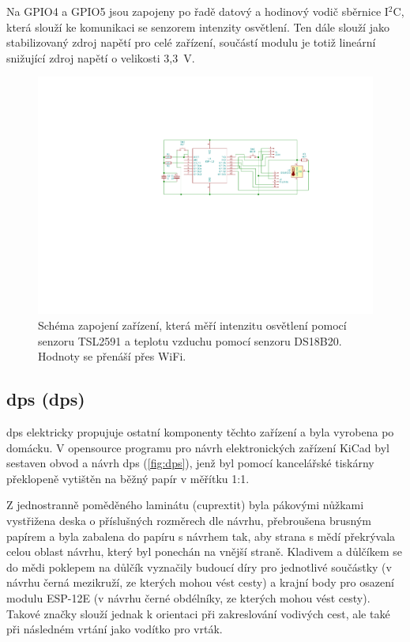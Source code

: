         Na GPIO4 a GPIO5 jsou zapojeny po řadě datový a hodinový vodič sběrnice I$^2$C, která slouží ke komunikaci se senzorem intenzity osvětlení. Ten dále slouží jako stabilizovaný zdroj napětí pro celé zařízení, součástí modulu je totiž lineární snižující zdroj napětí o velikosti 3{,}3~V.
        \begin{figure}
            \centering
            \includegraphics[draft=\draftfig,width=\textwidth,trim={10.8cm 10cm 5.5cm 5.3cm},clip]{img/hw/esp_lux_temp_sch.pdf}
            \caption[Schéma zapojení měřicích zařízení]{Schéma zapojení zařízení, která měří intenzitu osvětlení pomocí senzoru TSL2591 a teplotu vzduchu pomocí senzoru DS18B20. Hodnoty se přenáší přes WiFi.}
            \label{fig:schema}
        \end{figure}
    \subsection{\Acrlong{dps} (\acrshort{dps})}
        \acrshort{dps} elektricky propujuje ostatní komponenty těchto zařízení a byla vyrobena po domácku. V opensource programu pro návrh elektronických zařízení KiCad byl sestaven obvod a návrh \acrshort{dps} (\cref{fig:dps}), jenž byl pomocí kancelářské tiskárny překlopeně vytištěn na běžný papír v měřítku 1:1.
        
        Z jednostranně poměděného laminátu (cuprextit) byla pákovými nůžkami vystřižena deska o příslušných rozměrech dle návrhu, přebroušena brusným papírem a byla zabalena do papíru s návrhem tak, aby strana s mědí překrývala celou oblast návrhu, který byl ponechán na vnější straně. Kladivem a důlčíkem se do mědi poklepem na důlčík vyznačily budoucí díry pro jednotlivé součástky (v návrhu černá mezikruží, ze kterých mohou vést cesty) a krajní body pro osazení modulu ESP-12E (v návrhu černé obdélníky, ze kterých mohou vést cesty). Takové značky slouží jednak k orientaci při zakreslování vodivých cest, ale také při následném vrtání jako vodítko pro vrták.
        
